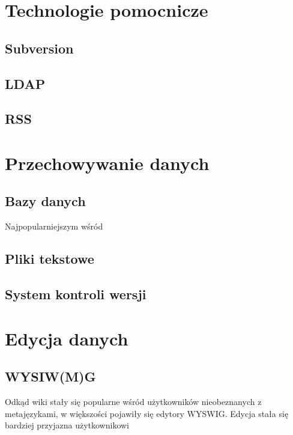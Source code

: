 \documentclass{article}
\begin{document}
\newpage
\section{Technologie pomocnicze}
	\subsection{Subversion}
	\subsection{LDAP}
	\subsection{RSS}
\newpage
\section{Przechowywanie danych}
	\subsection{Bazy danych}
	Najpopularniejszym wśród
	\subsection{Pliki tekstowe}
	\subsection{System kontroli wersji}

\newpage
\section{Edycja danych}
	\subsection{WYSIW(M)G}
	Odkąd wiki stały się popularne wśród użytkowników nieobeznanych z metajęzykami, 
w większości pojawiły się edytory WYSWIG. Edycja stała się bardziej przyjazna użytkownikowi
\end{document}

